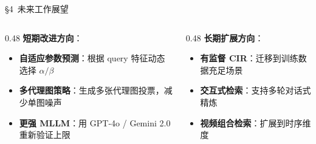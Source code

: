 \documentclass[aspectratio=169,12pt]{beamer}
\begin{document}
\begin{frame}[shrink=5]{\S4~未来工作展望}
\begin{columns}[T]
\begin{column}{0.48\textwidth}
\textbf{短期改进方向}：
\begin{itemize}\small
  \item \textbf{自适应参数预测}：根据 query 特征动态选择 $\alpha/\beta$
  \item \textbf{多代理图策略}：生成多张代理图投票，减少单图噪声
  \item \textbf{更强 MLLM}：用 GPT-4o / Gemini 2.0 重新验证上限
\end{itemize}
\end{column}
\begin{column}{0.48\textwidth}
\textbf{长期扩展方向}：
\begin{itemize}\small
  \item \textbf{有监督 CIR}：迁移到训练数据充足场景
  \item \textbf{交互式检索}：支持多轮对话式精炼
  \item \textbf{视频组合检索}：扩展到时序维度
\end{itemize}
\end{column}
\end{columns}

\vspace{1.5em}
\begin{center}
\end{center}
\end{frame}

\appendix
\end{document}
